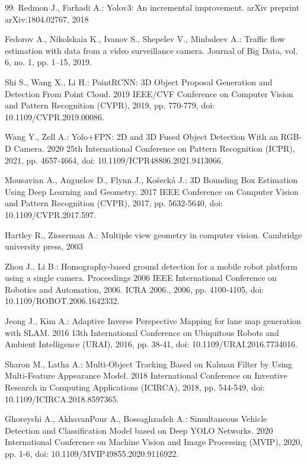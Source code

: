 \begin{thebibliography}{99.}
Redmon J., Farhadi A.:
Yolov3: An incremental improvement.
arXiv preprint arXiv:1804.02767, 2018

Fedorov A., Nikolskaia K., Ivanov S., Shepelev V., Minbaleev A.:
Traffic flow estimation with data from a video surveillance camera.
Journal of Big Data, vol. 6, no. 1, pp. 1–15, 2019.

Shi S., Wang X., Li H.:
PointRCNN: 3D Object Proposal Generation and Detection From Point Cloud.
2019 IEEE/CVF Conference on Computer Vision and Pattern Recognition (CVPR), 2019, pp. 770-779, doi: 10.1109/CVPR.2019.00086.

Wang Y., Zell A.:
Yolo+FPN: 2D and 3D Fused Object Detection With an RGB-D Camera.
2020 25th International Conference on Pattern Recognition (ICPR), 2021, pp. 4657-4664, doi: 10.1109/ICPR48806.2021.9413066.

Mousavian A., Anguelov D., Flynn J., Košecká J.:
3D Bounding Box Estimation Using Deep Learning and Geometry.
2017 IEEE Conference on Computer Vision and Pattern Recognition (CVPR), 2017, pp. 5632-5640, doi: 10.1109/CVPR.2017.597.

Hartley R., Zisserman A.:
Multiple view geometry in computer vision.
Cambridge university press, 2003

Zhou J., Li B.:
Homography-based ground detection for a mobile robot platform using a single camera.
Proceedings 2006 IEEE International Conference on Robotics and Automation, 2006. ICRA 2006., 2006, pp. 4100-4105, doi: 10.1109/ROBOT.2006.1642332.

Jeong J., Kim A.:
Adaptive Inverse Perspective Mapping for lane map generation with SLAM.
2016 13th International Conference on Ubiquitous Robots and Ambient Intelligence (URAI), 2016, pp. 38-41, doi: 10.1109/URAI.2016.7734016.

Sharon M., Latha A.:
Multi-Object Tracking Based on Kalman Filter by Using Multi-Feature Appearance Model.
2018 International Conference on Inventive Research in Computing Applications (ICIRCA), 2018, pp. 544-549, doi: 10.1109/ICIRCA.2018.8597365.

Ghoreyshi A., AkhavanPour A., Bossaghzadeh A.:
Simultaneous Vehicle Detection and Classification Model based on Deep YOLO Networks.
2020 International Conference on Machine Vision and Image Processing (MVIP), 2020, pp. 1-6, doi: 10.1109/MVIP49855.2020.9116922.



\end{thebibliography}
